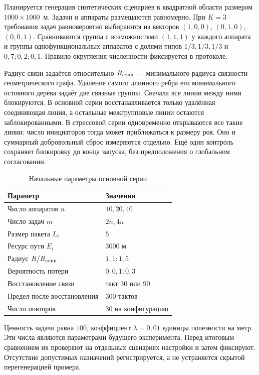 \documentclass{misisarticle}
\begin{document}
Планируется генерация синтетических сценариев в квадратной области размером $1000\times1000$~м. Задачи и аппараты размещаются равномерно. При $K=3$ требования задач равновероятно выбираются из векторов $(1,0,0)$, $(0,1,0)$, $(0,0,1)$. Сравниваются группа с возможностями $(1,1,1)$ у каждого аппарата и группы однофункциональных аппаратов с долями типов $1/3,1/3,1/3$ и $0{,}7;0{,}2;0{,}1$. Правило округления численности фиксируется в протоколе.

Радиус связи задаётся относительно $R_{\rm conn}$ --- минимального радиуса связности геометрического графа. Удаление самого длинного ребра его минимального остовного дерева задаёт две связные группы. Сначала все линии между ними блокируются. В основной серии восстанавливается только удалённая соединяющая линия, а остальные межгрупповые линии остаются заблокированными. В стрессовой серии одновременно открываются все такие линии: число инициаторов тогда может приближаться к размеру роя. Оно и суммарный добровольный сброс измеряются отдельно. Ещё один контроль сохраняет блокировку до конца запуска, без предположения о глобальном согласовании.

\begin{table}[htbp]
\caption{Начальные параметры основной серии}
\label{tab:protocol}
\centering
\small
\setlength{\tabcolsep}{3pt}
\begin{tabular}{p{}p{}}
\toprule
Параметр & Значения \\
\midrule
Число аппаратов $n$ & $10,20,40$ \\
Число задач $m$ & $2n,4n$ \\
Размер пакета $L_i$ & $5$ \\
Ресурс пути $E_i$ & $3000$ м \\
Радиус $R/R_{\rm conn}$ & $1{,}1;1{,}5$ \\
Вероятность потери & $0;0{,}1;0{,}3$ \\
Восстановление связи & такт $30$ или $90$ \\
Предел после восстановления & $300$ тактов \\
Число повторов & $30$ на конфигурацию \\
\bottomrule
\end{tabular}
\end{table}

Ценность задачи равна $100$, коэффициент $\lambda=0{,}01$ единицы полезности на метр. Эти числа являются параметрами будущего эксперимента. Перед итоговым сравнением их проверяют на отдельных сценариях настройки и затем фиксируют. Отсутствие допустимых назначений регистрируется, а не устраняется скрытой перегенерацией примера.
\end{document}
